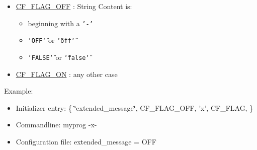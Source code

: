 \begin{itemize}
\item \hyperlink{group__cflib__core_g7010abac2c80c121772da4d9c03332ee}{CF\_\-FLAG\_\-OFF} : String Content is:\begin{itemize}
\item beginning with a {\tt '-'} \item {\tt \char`\"{}OFF\char`\"{}} or {\tt \char`\"{}off\char`\"{}} \item {\tt \char`\"{}FALSE\char`\"{}} or {\tt \char`\"{}false\char`\"{}} \end{itemize}
\item \hyperlink{group__cflib__core_g355c714f2912ac336b8b03468c978d8c}{CF\_\-FLAG\_\-ON} : any other case\end{itemize}
\begin{Desc}
\item[Example:]\begin{itemize}
\item Initializer entry: \{ \char`\"{}extended\_\-message\char`\"{}, CF\_\-FLAG\_\-OFF, 'x', CF\_\-FLAG, \}\item Commandline: myprog -x-\item Configuration file: extended\_\-message = OFF \end{itemize}
\end{Desc}
